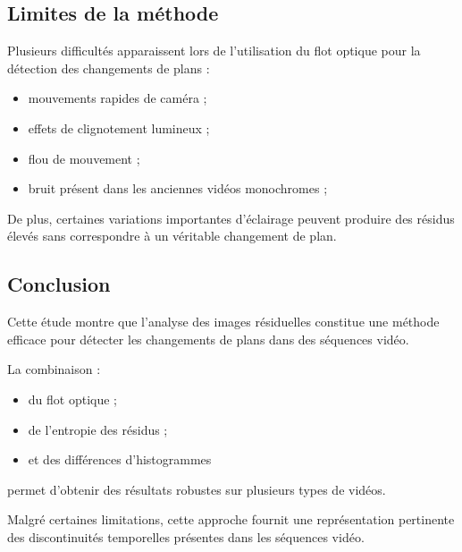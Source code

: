 \documentclass[11pt,a4paper]{article}
\begin{document}
    \subsection*{Limites de la méthode}
    
    Plusieurs difficultés apparaissent lors de l’utilisation du flot optique pour la détection des changements de plans :
    
    \begin{itemize}
        \item mouvements rapides de caméra ;
        
        \item effets de clignotement lumineux ;
        
        \item flou de mouvement ;
        
        \item bruit présent dans les anciennes vidéos monochromes ;
        
    \end{itemize}
    
    De plus, certaines variations importantes d’éclairage peuvent produire des résidus élevés sans correspondre à un véritable changement de plan.
    
    \subsection*{Conclusion}
    
    Cette étude montre que l’analyse des images résiduelles constitue une méthode efficace pour détecter les changements de plans dans des séquences vidéo.
    
    La combinaison :
    \begin{itemize}
        \item du flot optique ;
        \item de l’entropie des résidus ;
        \item et des différences d’histogrammes
    \end{itemize}
    
    permet d’obtenir des résultats robustes sur plusieurs types de vidéos.
    
    \vspace{0.3cm}
    
    Malgré certaines limitations, cette approche fournit une représentation pertinente des discontinuités temporelles présentes dans les séquences vidéo.
    
\end{document}
